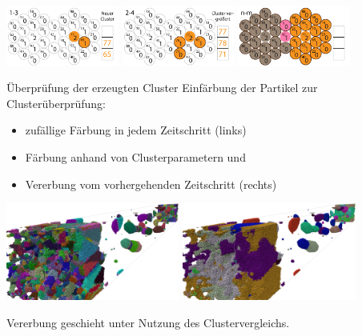 \documentclass[10pt]{beamer}
\begin{document}
\begin{frame}
	\includegraphics*[width=3.7cm]{media/cluster/cfd003.png} \includegraphics*[width=3.7cm]{media/cluster/cfd007.png}	\includegraphics*[width=3.7cm]{media/cluster/cfd011.png}
\end{frame}

%
%
\begin{frame}{Überprüfung der erzeugten Cluster}
	Einfärbung der Partikel zur Clusterüberprüfung:
	\begin{itemize}
		\item zufällige Färbung in jedem Zeitschritt (links)
		\item Färbung anhand von Clusterparametern und
		\item Vererbung vom vorhergehenden Zeitschritt (rechts)
	\end{itemize}
	
	\includegraphics*[width=5.7cm]{media/eva/clusterfarbe-allRd-small.png}
	\includegraphics*[width=5.7cm]{media/eva/clusterfarbe-rdInteritance-small.png}
	
	Vererbung geschieht unter Nutzung des Clustervergleichs. %
\end{frame}
\end{document}
